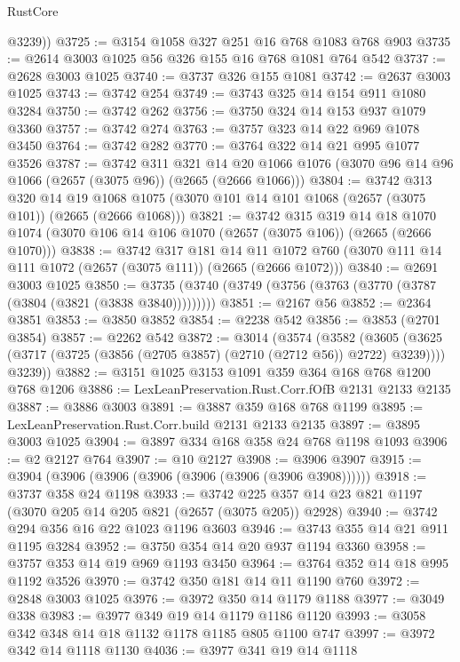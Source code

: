 \begin{lexlean}{RustCore}
\begin{coremodule}
        @3239))
@3725 := @3154 @1058 @327 @251 @16 @768 @1083 @768 @903
@3735 := @2614 @3003 @1025 @56 @326 @155 @16 @768 @1081 @764 @542
@3737 := @2628 @3003 @1025
@3740 := @3737 @326 @155 @1081
@3742 := @2637 @3003 @1025
@3743 := @3742 @254
@3749 := @3743 @325 @14 @154 @911 @1080 @3284
@3750 := @3742 @262
@3756 := @3750 @324 @14 @153 @937 @1079 @3360
@3757 := @3742 @274
@3763 := @3757 @323 @14 @22 @969 @1078 @3450
@3764 := @3742 @282
@3770 := @3764 @322 @14 @21 @995 @1077 @3526
@3787 := @3742
    @311
    @321
    @14
    @20
    @1066
    @1076
    (@3070 @96 @14 @96 @1066 (@2657 (@3075 @96)) (@2665 (@2666 @1066)))
@3804 := @3742
    @313
    @320
    @14
    @19
    @1068
    @1075
    (@3070 @101 @14 @101 @1068 (@2657 (@3075 @101)) (@2665 (@2666 @1068)))
@3821 := @3742
    @315
    @319
    @14
    @18
    @1070
    @1074
    (@3070 @106 @14 @106 @1070 (@2657 (@3075 @106)) (@2665 (@2666 @1070)))
@3838 := @3742
    @317
    @181
    @14
    @11
    @1072
    @760
    (@3070 @111 @14 @111 @1072 (@2657 (@3075 @111)) (@2665 (@2666 @1072)))
@3840 := @2691 @3003 @1025
@3850 := @3735 (@3740 (@3749 (@3756 (@3763 (@3770 (@3787 (@3804 (@3821 (@3838 @3840)))))))))
@3851 := @2167 @56
@3852 := @2364 @3851
@3853 := @3850 @3852
@3854 := @2238 @542
@3856 := @3853 (@2701 @3854)
@3857 := @2262 @542
@3872 := @3014
    (@3574
      (@3582
        (@3605 (@3625 (@3717 (@3725 (@3856 (@2705 @3857) (@2710 (@2712 @56)) @2722) @3239))))
        @3239))
@3882 := @3151 @1025 @3153 @1091 @359 @364 @168 @768 @1200 @768 @1206
@3886 := LexLeanPreservation.Rust.Corr.fOfB @2131 @2133 @2135
@3887 := @3886 @3003
@3891 := @3887 @359 @168 @768 @1199
@3895 := LexLeanPreservation.Rust.Corr.build @2131 @2133 @2135
@3897 := @3895 @3003 @1025
@3904 := @3897 @334 @168 @358 @24 @768 @1198 @1093
@3906 := @2 @2127 @764
@3907 := @10 @2127
@3908 := @3906 @3907
@3915 := @3904 (@3906 (@3906 (@3906 (@3906 (@3906 (@3906 @3908))))))
@3918 := @3737 @358 @24 @1198
@3933 := @3742 @225 @357 @14 @23 @821 @1197 (@3070 @205 @14 @205 @821 (@2657 (@3075 @205)) @2928)
@3940 := @3742 @294 @356 @16 @22 @1023 @1196 @3603
@3946 := @3743 @355 @14 @21 @911 @1195 @3284
@3952 := @3750 @354 @14 @20 @937 @1194 @3360
@3958 := @3757 @353 @14 @19 @969 @1193 @3450
@3964 := @3764 @352 @14 @18 @995 @1192 @3526
@3970 := @3742 @350 @181 @14 @11 @1190 @760
@3972 := @2848 @3003 @1025
@3976 := @3972 @350 @14 @1179 @1188
@3977 := @3049 @338
@3983 := @3977 @349 @19 @14 @1179 @1186 @1120
@3993 := @3058 @342 @348 @14 @18 @1132 @1178 @1185 @805 @1100 @747
@3997 := @3972 @342 @14 @1118 @1130
@4036 := @3977
    @341
    @19
    @14
    @1118

\end{coremodule}
\end{lexlean}
